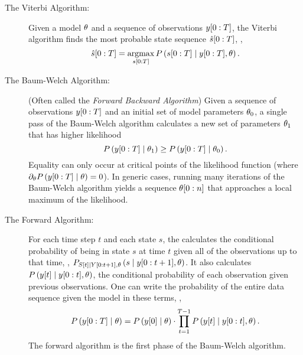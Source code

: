 \begin{description}
\item[The Viterbi Algorithm:]  Given a model
  $\theta$ and a sequence of observations $y[0:T]$, the
  Viterbi algorithm finds the most probable state sequence $\hat
    s[0:T]$, \ie,
  \begin{equation}
    \label{eq:intro-viterbi}
    \hat s[0:T] = \operatorname*{argmax}_{s[0:T]} P
    \left(s[0:T]\mid y[0:T],\theta\right).
  \end{equation}
\item[The Baum-Welch Algorithm:] 
  (Often
  called the \emph{Forward Backward Algorithm}) Given a sequence of
  observations $y[0:T]$ and an initial set of model parameters
  $\theta_0$, a single pass of the Baum-Welch algorithm
  calculates a new set of parameters $\theta_1$ that has higher
  likelihood
  \begin{equation}
    \label{eq:intro-fba}
    P\left( y[0:T]\mid \theta_1 \right) \geq
    P\left( y[0:T]\mid \theta_0 \right).
  \end{equation}
  Equality can only occur at critical points of the likelihood
  function (where $\partial_\theta P\left(
    y[0:T]\mid \theta \right) = 0$).  In generic cases,
running many iterations of the Baum-Welch algorithm yields a sequence
$\theta[0:n]$ that approaches a local maximum of the
likelihood.
\item[The Forward Algorithm:] For each time step $t$ and each state
  $s$, the  calculates the conditional
  probability of being in state $s$ at time $t$ given all of the
  observations up to that time, \ie,
  $P_{{S}{[t]}\mid Y[0:t+1],\theta} \left(s\mid
    y[0:t+1], \theta \right)$. It also calculates
  $P\left({y}{[t]}\mid y[0:t], \theta \right)$, the
  conditional probability of each observation given previous
  observations.  One can write the probability of the entire data
  sequence given the model in these terms, \ie,
  \begin{equation*}
    P \left(y[0:T]\mid \theta \right) =  P \left({y}{[0]}
      \mid \theta \right) \cdot  \prod_{t=1}^{T-1} P
    \left({y}{[t]}\mid y[0:t], \theta \right).
  \end{equation*}
  The forward algorithm is the first phase of the Baum-Welch algorithm.
\end{description}

